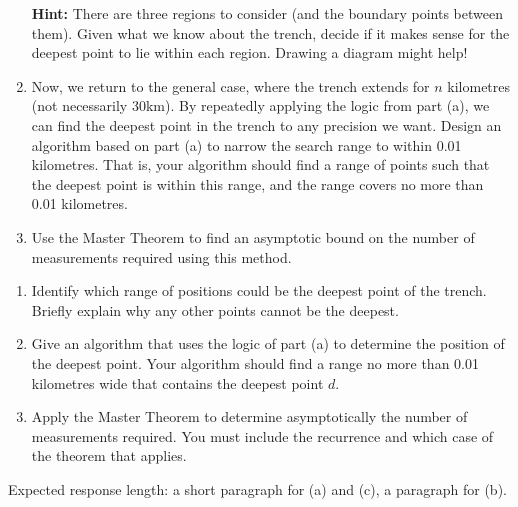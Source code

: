 \documentclass[12pt]{article}
\begin{document}
\begin{question}
\begin{enumerate}
    \textbf{Hint:} There are three regions to consider (and the boundary points between them). Given what we know about the trench, decide if it makes sense for the deepest point to lie within each region. Drawing a diagram might help!
    
    \item Now, we return to the general case, where the trench extends for $n$ kilometres (not necessarily 30km). By repeatedly applying the logic from part (a), we can find the deepest point in the trench to any precision we want. Design an algorithm based on part (a) to narrow the search range to within 0.01 kilometres. That is, your algorithm should find a range of points such that the deepest point is within this range, and the range covers no more than 0.01 kilometres.
    
    \item Use the Master Theorem to find an asymptotic bound on the number of measurements required using this method.
\end{enumerate}
\end{question}

\begin{rubric}
\begin{enumerate}
    \item Identify which range of positions could be the deepest point of the trench. Briefly explain why any other points cannot be the deepest.
    \item Give an algorithm that uses the logic of part (a) to determine the position of the deepest point. Your algorithm should find a range no more than 0.01 kilometres wide that contains the deepest point $d$.
    \item Apply the Master Theorem to determine asymptotically the number of measurements required. You must include the recurrence and which case of the theorem that applies.    
\end{enumerate}
Expected response length: a short paragraph for (a) and (c), a paragraph for (b).
\end{rubric}

\begin{solution}
\end{solution}

\begin{attribution}
\end{attribution}
\end{document}
